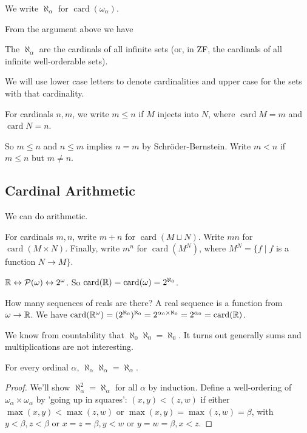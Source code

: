 \documentclass[a3paper, 10pt]{article}
\newcommand{\card}{\operatorname{card}}
\begin{document}
\begin{multicols*}{5}
\begin{definition}
  We write $\aleph_\alpha$ for $\card(\omega_\alpha)$.
\end{definition}

From the argument above we have

\begin{theorem}
  The $\aleph_\alpha$ are the cardinals of all infinite sets (or, in ZF, the cardinals of all infinite well-orderable sets).
\end{theorem}

We will use lower case letters to denote cardinalities and upper case for the sets with that cardinality.

\begin{definition}
  For cardinals $n, m$, we write $m \leq n$ if $M$ injects into $N$, where $\card M = m$ and $\card N = n$. 

  So $m \leq n$ and $n \leq m$ implies $n = m$ by Schr\"oder-Bernstein. Write $m < n$ if $m \leq n$ but $m \neq n$.
\end{definition}

\subsection{Cardinal Arithmetic}

We can do arithmetic.


\begin{definition}
  For cardinals $m, n$, write $m +n$ for $\card(M \sqcup N)$. Write $mn$ for $\card(M \times N)$. Finally, write $m^n$ for $\card(M^N)$, where $M^N = \{f \mid f$ is a function $N \rightarrow M\}$.
\end{definition}

\begin{example}
  $\mathbb{R} \leftrightarrow \mathcal{P}(\omega) \leftrightarrow 2^\omega$.
  So $\card(\R) = \card(\mathcal{\omega}) = 2^{\aleph_0}$.
\end{example}

\begin{example}
  How many sequences of reals are there? A real sequence is a function from $\omega \rightarrow \mathbb{R}$. We have $\card(\R^\omega) = (2^{\aleph_0})^{\aleph_0} = 2^{\alpha_0 \times \aleph_0} = 2^{\alpha_0} = \card(\R)$.
\end{example}

We know from countability that $\aleph_0 \aleph_0 = \aleph_0$. It turns out generally sums and multiplications are not interesting.
\begin{theorem}
  For every ordinal $\alpha$, $\aleph_\alpha \aleph_\alpha = \aleph_\alpha$.
\end{theorem}
\begin{proof}
  We'll show $\aleph_\alpha^2=\aleph_\alpha$ for all $\alpha$ by induction. Define a well-ordering of $\omega_\alpha \times \omega_\alpha$ by 'going up in squares': $(x, y)<(z, w)$ if either $\max (x, y)<\max (z, w)$ or $\max (x, y)=\max (z, w)=\beta$, with $y<\beta, z<\beta$ or $x=z=\beta, y<w$ or $y=w=\beta, x<z$.


\end{proof}
\end{multicols*}
\end{document}
